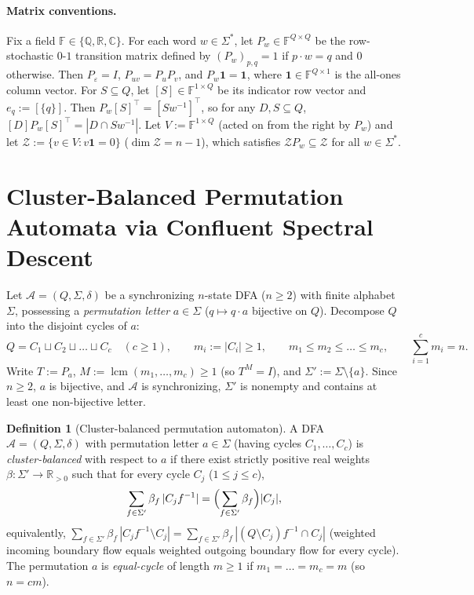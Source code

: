 \documentclass[11pt,a4paper]{article}
\theoremstyle{definition}
\newtheorem{definition}[theorem]{Definition}
\theoremstyle{remark}
\newcommand{\lcm}{\operatorname{lcm}}
\newcommand{\one}{\mathbf{1}}
\newcommand{\Q}{\mathbb{Q}}
\newcommand{\R}{\mathbb{R}}
\newcommand{\C}{\mathbb{C}}
\newcommand{\cA}{\mathcal{A}}
\newcommand{\cZ}{\mathcal{Z}}
\newcommand{\ind}[1]{[#1]}
\begin{document}
\paragraph{Matrix conventions.}
Fix a field $\mathbb{F} \in \{\Q, \R, \C\}$. For each word $w \in \Sigma^*$, let $P_w \in \mathbb{F}^{Q \times Q}$ be the row-stochastic $0$-$1$ transition matrix defined by $(P_w)_{p,q} = 1$ if $p \cdot w = q$ and $0$ otherwise. Then $P_\varepsilon = I$, $P_{uv} = P_u P_v$, and $P_w \one = \one$, where $\one \in \mathbb{F}^{Q \times 1}$ is the all-ones column vector. For $S \subseteq Q$, let $\ind{S} \in \mathbb{F}^{1 \times Q}$ be its indicator row vector and $e_q := \ind{\{q\}}$. Then $P_w \ind{S}^\top = \ind{S w^{-1}}^\top$, so for any $D, S \subseteq Q$, $\ind{D} P_w \ind{S}^\top = |D \cap S w^{-1}|$. Let $V := \mathbb{F}^{1 \times Q}$ (acted on from the right by $P_w$) and let $\cZ := \{v \in V : v \one = 0\}$ ($\dim \cZ = n-1$), which satisfies $\cZ P_w \subseteq \cZ$ for all $w \in \Sigma^*$.

\section{Cluster-Balanced Permutation Automata via Confluent Spectral Descent}
\label{sec:cluster-balanced}

Let $\cA = (Q, \Sigma, \delta)$ be a synchronizing $n$-state DFA ($n \ge 2$) with finite alphabet $\Sigma$, possessing a \emph{permutation letter} $a \in \Sigma$ ($q \mapsto q \cdot a$ bijective on $Q$). Decompose $Q$ into the disjoint cycles of $a$:
\[
  Q = C_1 \sqcup C_2 \sqcup \dots \sqcup C_c \quad (c \ge 1), \qquad m_i := |C_i| \ge 1, \qquad m_1 \le m_2 \le \dots \le m_c, \qquad \sum_{i=1}^c m_i = n.
\]
Write $T := P_a$, $M := \lcm(m_1, \dots, m_c) \ge 1$ (so $T^M = I$), and $\Sigma' := \Sigma \setminus \{a\}$. Since $n \ge 2$, $a$ is bijective, and $\cA$ is synchronizing, $\Sigma'$ is nonempty and contains at least one non-bijective letter.

\begin{definition}[Cluster-balanced permutation automaton]
\label{def:cb}
A DFA $\cA = (Q, \Sigma, \delta)$ with permutation letter $a \in \Sigma$ (having cycles $C_1, \dots, C_c$) is \emph{cluster-balanced} with respect to $a$ if there exist strictly positive real weights $\beta : \Sigma' \to \R_{>0}$ such that for every cycle $C_j$ ($1 \le j \le c$),
\begin{equation}
  \sum_{f \in \Sigma'} \beta_f \, |C_j f^{-1}| = \Bigl(\sum_{f \in \Sigma'} \beta_f\Bigr) |C_j|,
  \label{eq:cb}
\end{equation}
equivalently, $\sum_{f \in \Sigma'} \beta_f \, |C_j f^{-1} \setminus C_j| = \sum_{f \in \Sigma'} \beta_f \, |(Q \setminus C_j) f^{-1} \cap C_j|$ (weighted incoming boundary flow equals weighted outgoing boundary flow for every cycle). The permutation $a$ is \emph{equal-cycle} of length $m \ge 1$ if $m_1 = \dots = m_c = m$ (so $n = cm$).
\end{definition}
\end{document}
